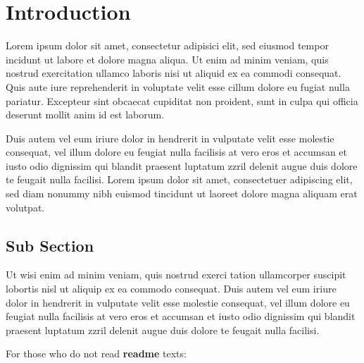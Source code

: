\section{Introduction}
\label{sec:introduction}
Lorem ipsum dolor sit amet, consectetur adipisici elit, sed eiusmod tempor incidunt ut labore et dolore magna aliqua. Ut enim ad minim veniam, quis nostrud exercitation ullamco laboris nisi ut aliquid ex ea commodi consequat. Quis aute iure reprehenderit in voluptate velit esse cillum dolore eu fugiat nulla pariatur. Excepteur sint obcaecat cupiditat non proident, sunt in culpa qui officia deserunt mollit anim id est laborum.

Duis autem vel eum iriure dolor in hendrerit in vulputate velit esse molestie consequat, vel illum dolore eu feugiat nulla facilisis at vero eros et accumsan et iusto odio dignissim qui blandit praesent luptatum zzril delenit augue duis dolore te feugait nulla facilisi. Lorem ipsum dolor sit amet, consectetuer adipiscing elit, sed diam nonummy nibh euismod tincidunt ut laoreet dolore magna aliquam erat volutpat.

\subsection{Sub Section}
\label{sec:subSection}
Ut wisi enim ad minim veniam, quis nostrud exerci tation ullamcorper suscipit lobortis nisl ut aliquip ex ea commodo consequat. Duis autem vel eum iriure dolor in hendrerit in vulputate velit esse molestie consequat, vel illum dolore eu feugiat nulla facilisis at vero eros et accumsan et iusto odio dignissim qui blandit praesent luptatum zzril delenit augue duis dolore te feugait nulla facilisi.

 For those who do not read \textbf{readme} texts:

